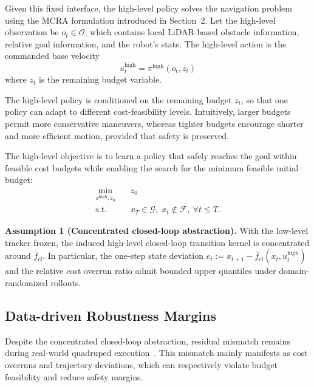 \documentclass{article}
\begin{document}
Given this fixed interface, the high-level policy solves the navigation problem using the MCRA formulation introduced in Section~2. Let the high-level observation be $o_t \in \mathcal{O}$, which contains local LiDAR-based obstacle information, relative goal information, and the robot's state. The high-level action is the commanded base velocity
\begin{equation}
u_t^{\mathrm{high}}=\pi^{\mathrm{high}}(o_t,z_t)
\end{equation}
where $z_t$ is the remaining budget variable.

The high-level policy is conditioned on the remaining budget $z_t$, so that one policy can adapt to different cost-feasibility levels. Intuitively, larger budgets permit more conservative maneuvers, whereas tighter budgets encourage shorter and more efficient motion, provided that safety is preserved.

The high-level objective is to learn a policy that safely reaches the goal within feasible cost budgets while enabling the search for the minimum feasible initial budget:
\begin{equation}
\begin{aligned}
\min_{\pi^{\mathrm{high}}, z_0}\quad & z_0 \\
\mathrm{s.t.}\quad &
x_T \in \mathcal{G}, \;
x_t \notin \mathcal{F}, \ \forall t\le T .
\end{aligned}
\end{equation}

\noindent\textbf{Assumption 1 (Concentrated closed-loop abstraction).}
With the low-level tracker frozen, the induced high-level closed-loop transition kernel is concentrated around $\bar{f}_{\mathrm{cl}}$. In particular, the one-step state deviation
\(
e_t:=x_{t+1}-\bar{f}_{\mathrm{cl}}(x_t,u_t^{\mathrm{high}})
\)
and the relative cost overrun ratio admit bounded upper quantiles under domain-randomized rollouts.

\subsection{Data-driven Robustness Margins}

Despite the concentrated closed-loop abstraction, residual mismatch remains during real-world quadruped execution~\citep{smirnova2019,wang2021,liu2022drql}. This mismatch mainly manifests as cost overruns and trajectory deviations, which can respectively violate budget feasibility and reduce safety margins.
\end{document}
